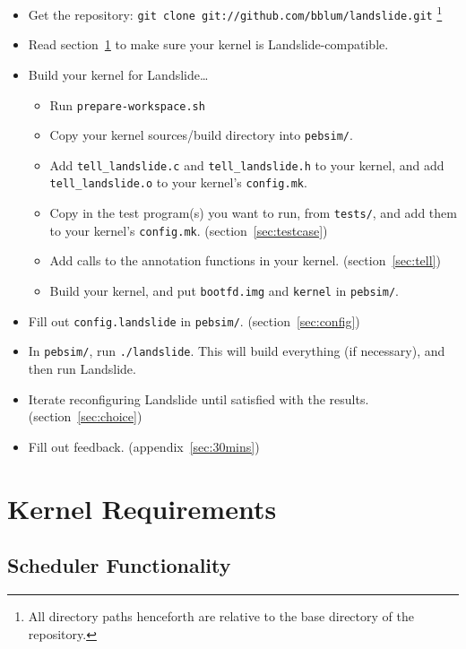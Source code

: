 \documentclass{article}
\begin{document}
\begin{itemize}
	\item Get the repository: \texttt{git clone git://github.com/bblum/landslide.git}
		\footnote{All directory paths henceforth are relative to the base directory of the repository.}
	\item Read section~\ref{sec:requirements} to make sure your kernel is Landslide-compatible.
	\item Build your kernel for Landslide\dots
	\begin{itemize}
		\item Run \texttt{prepare-workspace.sh}
		\item Copy your kernel sources/build directory into \texttt{pebsim/}.
		\item Add \texttt{tell\_landslide.c} and \texttt{tell\_landslide.h} to your kernel, and add \texttt{tell\_landslide.o} to your kernel's \texttt{config.mk}.
		\item Copy in the test program(s) you want to run, from \texttt{tests/}, and add them to your kernel's \texttt{config.mk}. (section~\ref{sec:testcase})
		\item Add calls to the annotation functions in your kernel. (section~\ref{sec:tell})
		\item Build your kernel, and put \texttt{bootfd.img} and \texttt{kernel} in \texttt{pebsim/}.
	\end{itemize}
	\item Fill out \texttt{config.landslide} in \texttt{pebsim/}. (section~\ref{sec:config})
	\item In \texttt{pebsim/}, run \texttt{./landslide}. This will build everything (if necessary), and then run Landslide.
	\item Iterate reconfiguring Landslide until satisfied with the results. (section~\ref{sec:choice})
	\item Fill out feedback. (appendix~\ref{sec:30mins})
\end{itemize}

\section{Kernel Requirements}
\label{sec:requirements}

\subsection{Scheduler Functionality}
\label{sec:schedfunc}
\end{document}
